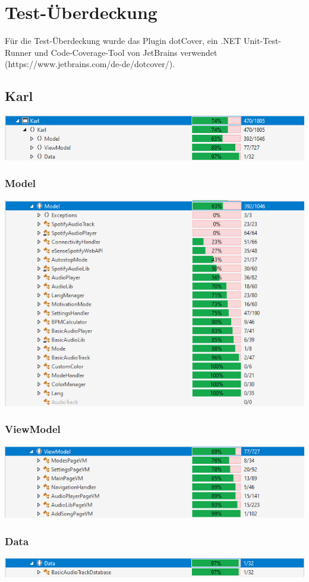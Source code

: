\documentclass[../validierung.tex]{subfiles}
\begin{document}
\section{Test-Überdeckung}
	Für die Test-Überdeckung wurde das Plugin dotCover, ein .NET Unit-Test-Runner und Code-Coverage-Tool von JetBrains verwendet (https://www.jetbrains.com/de-de/dotcover/).
	\subsection{Karl}
		\includegraphics[width=\textwidth]{karl.png}
			\subsubsection{Model}
				\includegraphics[width=\textwidth]{model.png}
			\subsubsection{ViewModel}
				\includegraphics[width=\textwidth]{vm.png}
			\subsubsection{Data}
				\includegraphics[width=\textwidth]{data.png}
\end{document}
